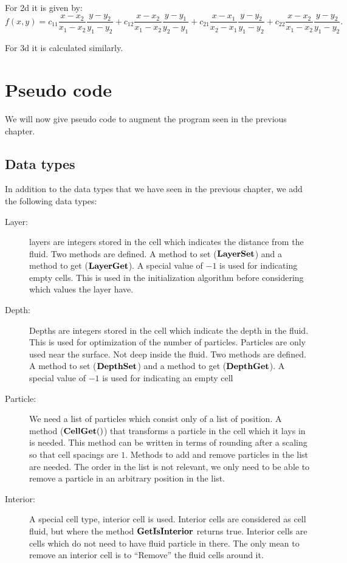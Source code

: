 For 2d it is given by:
\begin{equation}
	f(x,y)=c_{11}\frac{x-x_{2}}{x_{1}-x_{2}}\frac{y-y_{2}}{y_{1}-y_{2}}+c_{12}\frac{x-x_{2}}{x_{1}-x_{2}}\frac{y-y_{1}}{y_{2}-y_{1}}
	+c_{21}\frac{x-x_{1}}{x_{2}-x_{1}}\frac{y-y_{2}}{y_{1}-y_{2}}+c_{22}\frac{x-x_{2}}{x_{1}-x_{2}}\frac{y-y_{2}}{y_{1}-y_{2}}.
\end{equation}

For 3d it is calculated similarly.

\section{Pseudo code}

We will now give pseudo code to augment the program seen in the previous chapter.

\subsection{Data types}

In addition to the data types that we have seen in the previous chapter, we add the following data types:

\begin{description}
\item[Layer:]
layers are integers stored in the cell which indicates the distance from the fluid.
Two methods are defined. A method to set ($\mathop{\textbf{LayerSet}}$) and a method to get ($\mathop{\textbf{LayerGet}}$).
A special value of $-1$ is used for indicating empty cells. This is used in the initialization algorithm before considering
which values the layer have.
\item[Depth:]
Depths are integers stored in the cell which indicate the depth in the fluid.
This is used for optimization of the number of particles. Particles are only used near the surface.
Not deep inside the fluid.
Two methods are defined. A method to set ($\mathop{\textbf{DepthSet}}$) and a method to get ($\mathop{\textbf{DepthGet}}$).
A special value of $-1$ is used for indicating an empty cell
\item[Particle:]
We need a list of particles which consist only of a list of position.
A method ($\mathop{\textbf{CellGet}}()$) that transforms a particle in the cell which it lays in is needed.
This method can be written in terms of rounding after a scaling so that cell spacings are $1$.
Methods to add and remove particles in the list are needed.
The order in the list is not relevant, we only need to be able to remove a particle in an arbitrary position in the list.
\item[Interior:]
A special cell type, interior cell is used.
Interior cells are considered as cell fluid, but where the method $\mathop{\textbf{GetIsInterior}}$ returns true.
Interior cells are cells which do not need to have fluid particle in there.
The only mean to remove an interior cell is to ``Remove'' the fluid cells around it.
\end{description}

